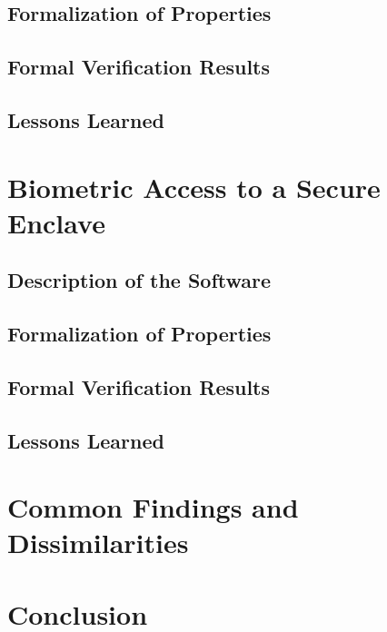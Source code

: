 \documentclass{article}
\begin{document}
\subsection{Formalization of Properties}
\subsection{Formal Verification Results}
\subsection{Lessons Learned}

\section{Biometric Access to a Secure Enclave}


\subsection{Description of the Software}
\subsection{Formalization of Properties}
\subsection{Formal Verification Results}
\subsection{Lessons Learned}

\section{Common Findings and Dissimilarities}

\section{Conclusion}


\end{document}
